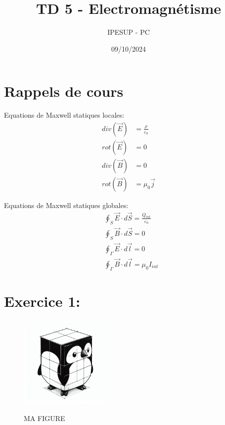 \documentclass{article}
\title{TD 5 - Electromagnétisme}
\author{IPESUP - PC }
\date{09/10/2024}
\begin{document}
\maketitle

\section{Rappels de cours}

Equations de Maxwell statiques locales:\\
\begin{align*}
    div(\vec{E}) &= \frac{\rho}{\varepsilon_0} \\
    rot(\vec{E}) &= 0 \\
    div(\vec{B}) &= 0 \\
    rot(\vec{B}) &= \mu_0 \vec{j}
\end{align*}

Equations de Maxwell statiques globales:\\

\begin{align*}
    &\oint_S \vec{E} \cdot d\vec{S} = \frac{Q_{int}}{\varepsilon_0} \\
    &\oint_S \vec{B} \cdot d\vec{S} = 0 \\
    &\oint_\Gamma \vec{E} \cdot d\vec{l} = 0 \\
    &\oint_\Gamma \vec{B} \cdot d\vec{l} = \mu_0 I_{int}
\end{align*}



\section{Exercice 1: }






\begin{figure}[h]
  \centering
  \includegraphics[width=0.4\textwidth]{pingouin_schema.jpeg}
  \label{fig:maison}
    \caption{MA FIGURE}
\end{figure}
\end{document}
